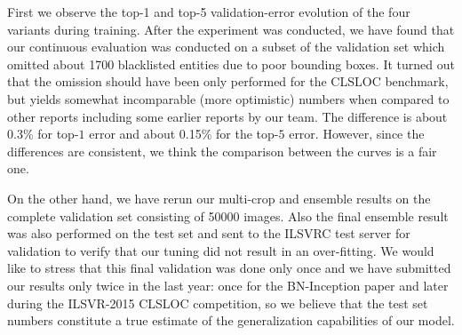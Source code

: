 \documentclass[10pt,twocolumn,letterpaper]{article}
\begin{document}
First we observe the top-1 and top-5 validation-error evolution of the
four variants during training. After the experiment was conducted, we have
found that our continuous evaluation was conducted on a subset of the
validation set which omitted about 1700 blacklisted entities due to poor
bounding boxes. It turned out that the omission should have been only performed
for the CLSLOC benchmark, but yields somewhat incomparable (more optimistic)
numbers when compared to other reports including some earlier reports by our
team. The difference is about 0.3\% for top-$1$ error and about 0.15\% for
the top-$5$ error. However, since the differences are consistent, we think
the comparison between the curves is a fair one.

On the other hand, we have rerun our multi-crop and ensemble results on the
complete validation set consisting of 50000 images. Also the final ensemble
result was also performed on the test set and sent to the ILSVRC test server
for validation to verify that our tuning did not result in an over-fitting.
We would like to stress that this final validation was done only once and we
have submitted our results only twice in the last year: once for the
BN-Inception paper and later during the ILSVR-2015 CLSLOC competition, so
we believe that the test set numbers constitute a true estimate of the
generalization capabilities of our model.
\end{document}

